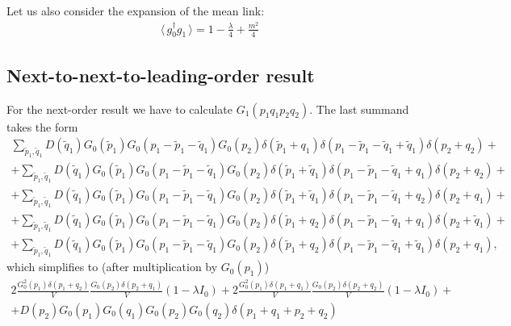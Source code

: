 \documentclass[12pt]{article}
\newcommand{\lr}[1]{ \left( #1 \right) }
\newcommand{\vev}[1]{ \langle \, #1 \, \rangle }
\begin{document}
 Let us also consider the expansion of the mean link:
\begin{eqnarray}
\label{mean_link_lo}
 \vev{g^{\dag}_0 g_1} = 1 - \frac{\lambda}{4} + \frac{m^2}{4}
\end{eqnarray}

\subsection*{Next-to-next-to-leading-order result}

 For the next-order result we have to calculate $G_1\lr{p_1 q_1 p_2 q_2}$. The last summand takes the form
\begin{eqnarray}
\label{G4_nlo1}
 \sum\limits_{\tilde{p}_1, \tilde{q}_1} D\lr{\tilde{q}_1} G_0\lr{\tilde{p}_1} G_0\lr{p_1 - \tilde{p}_1 - \tilde{q}_1} G_0\lr{p_2}
 \delta\lr{\tilde{p}_1 + q_1} \delta\lr{p_1 - \tilde{p}_1 - \tilde{q}_1 + \tilde{q}_1} \delta\lr{p_2 + q_2}
 + \nonumber \\ +
 \sum\limits_{\tilde{p}_1, \tilde{q}_1} D\lr{\tilde{q}_1} G_0\lr{\tilde{p}_1} G_0\lr{p_1 - \tilde{p}_1 - \tilde{q}_1} G_0\lr{p_2}
 \delta\lr{\tilde{p}_1 + \tilde{q}_1} \delta\lr{p_1 - \tilde{p}_1 - \tilde{q}_1 + q_1} \delta\lr{p_2 + q_2}
 + \nonumber \\ +
 \sum\limits_{\tilde{p}_1, \tilde{q}_1} D\lr{\tilde{q}_1} G_0\lr{\tilde{p}_1} G_0\lr{p_1 - \tilde{p}_1 - \tilde{q}_1} G_0\lr{p_2}
 \delta\lr{\tilde{p}_1 + \tilde{q}_1} \delta\lr{p_1 - \tilde{p}_1 - \tilde{q}_1 + q_2} \delta\lr{p_2 + q_1}
 + \nonumber \\ +
 \sum\limits_{\tilde{p}_1, \tilde{q}_1} D\lr{\tilde{q}_1} G_0\lr{\tilde{p}_1} G_0\lr{p_1 - \tilde{p}_1 - \tilde{q}_1} G_0\lr{p_2}
 \delta\lr{\tilde{p}_1 + q_2} \delta\lr{p_1 - \tilde{p}_1 - \tilde{q}_1 + q_1} \delta\lr{p_2 + \tilde{q}_1}
 + \nonumber \\ +
 \sum\limits_{\tilde{p}_1, \tilde{q}_1} D\lr{\tilde{q}_1} G_0\lr{\tilde{p}_1} G_0\lr{p_1 - \tilde{p}_1 - \tilde{q}_1} G_0\lr{p_2}
 \delta\lr{\tilde{p}_1 + q_2} \delta\lr{p_1 - \tilde{p}_1 - \tilde{q}_1 + \tilde{q}_1} \delta\lr{p_2 + q_1} ,
\end{eqnarray}
which simplifies to (after multiplication by $G_0\lr{p_1}$)
\begin{eqnarray}
\label{G4_nlo2}
 2 \frac{G_0^2\lr{p_1} \delta\lr{p_1 + q_2}}{V} \frac{G_0\lr{p_2} \delta\lr{p_2 + q_1}}{V} \lr{1 - \lambda I_0} +
 2 \frac{G_0^2\lr{p_1} \delta\lr{p_1 + q_1}}{V} \frac{G_0\lr{p_2} \delta\lr{p_2 + q_2}}{V} \lr{1 - \lambda I_0}
 + \nonumber \\ +
 D\lr{p_2} G_0\lr{p_1} G_0\lr{q_1} G_0\lr{p_2} G_0\lr{q_2} \delta\lr{p_1 + q_1 + p_2 + q_2}
\end{eqnarray}
\end{document}
